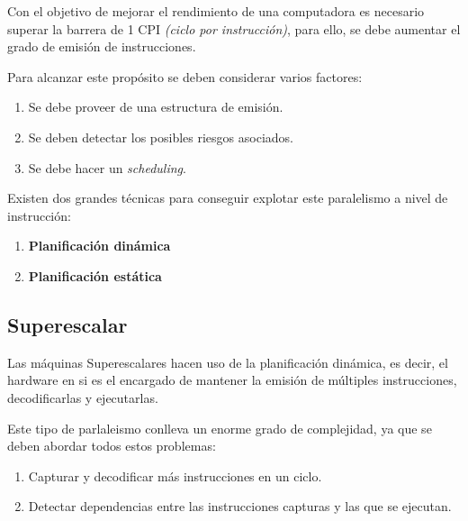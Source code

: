 Con el objetivo de mejorar el rendimiento de una computadora es necesario superar la barrera
de 1 CPI \textit{(ciclo por instrucción)}, para ello, se debe aumentar el grado de emisión de 
instrucciones.

\bigskip
Para alcanzar este propósito se deben considerar varios factores:

\begin{enumerate}

\item Se debe proveer de una estructura de emisión.

\item Se deben detectar los posibles riesgos asociados. 

\item Se debe hacer un \textit{scheduling}.

\end{enumerate}

\bigskip
Existen dos grandes técnicas para conseguir explotar este paralelismo a nivel de instrucción:

\begin{enumerate}

\item \textbf{Planificación dinámica}

\item \textbf{Planificación estática}

\end{enumerate}

\subsection{Superescalar}

Las máquinas Superescalares hacen uso de la planificación dinámica, es decir, el hardware 
en si es el encargado de mantener la emisión de múltiples instrucciones, decodificarlas y 
ejecutarlas.

\bigskip
Este tipo de parlaleismo conlleva un enorme grado de complejidad, ya que se deben abordar 
todos estos problemas:

\begin{enumerate}

\item Capturar y decodificar más instrucciones en un ciclo.

\item Detectar dependencias entre las instrucciones capturas y las que se ejecutan.

\end{enumerate}

